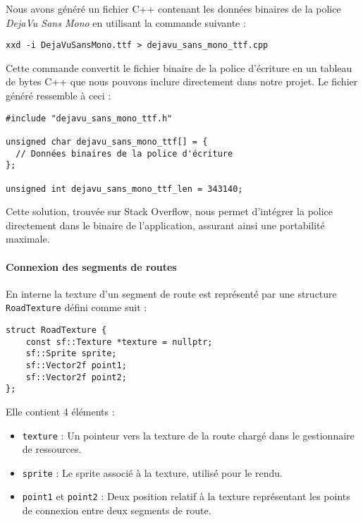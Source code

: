Nous avons généré un fichier C++ contenant les données binaires de la police \textit{DejaVu Sans Mono} en utilisant la commande suivante :
\begin{lstlisting}[style=BashStyle,label={lst:generation_dejavusansmonottf.h}]
xxd -i DejaVuSansMono.ttf > dejavu_sans_mono_ttf.cpp
\end{lstlisting}
Cette commande convertit le fichier binaire de la police d'écriture en un tableau de bytes C++ que nous pouvons inclure directement dans notre projet.
Le fichier généré ressemble à ceci :
\begin{lstlisting}[style=CStyle,label={lst:example_generated_from_xxd_-i}]
#include "dejavu_sans_mono_ttf.h"

unsigned char dejavu_sans_mono_ttf[] = {
  // Données binaires de la police d'écriture
};

unsigned int dejavu_sans_mono_ttf_len = 343140;
\end{lstlisting}
Cette solution, trouvée sur Stack Overflow\cite{stackoverflow_embed_font}, nous permet d'intégrer la police directement dans le binaire de l'application, assurant ainsi une portabilité maximale.

\paragraph{Connexion des segments de routes}
En interne la texture d'un segment de route est représenté par une structure \texttt{RoadTexture} défini comme suit :

\begin{lstlisting}[style=CStyle,label={lst:struct_roadtexture}]
struct RoadTexture {
    const sf::Texture *texture = nullptr;
    sf::Sprite sprite;
    sf::Vector2f point1;
    sf::Vector2f point2;
};
\end{lstlisting}

Elle contient 4 éléments :
\begin{itemize}
    \item \texttt{texture} : Un pointeur vers la texture de la route chargé dans le gestionnaire de ressources.
    \item \texttt{sprite} : Le sprite associé à la texture, utilisé pour le rendu.
    \item \texttt{point1} et \texttt{point2} : Deux position relatif à la texture représentant les points de connexion entre deux segments de route.
\end{itemize}

